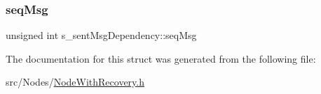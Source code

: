 \subsubsection{\texorpdfstring{seq\+Msg}{seqMsg}}
{\footnotesize\ttfamily unsigned int s\+\_\+sent\+Msg\+Dependency\+::seq\+Msg}



The documentation for this struct was generated from the following file\+:\begin{DoxyCompactItemize}
\item 
src/\+Nodes/\hyperlink{_node_with_recovery_8h}{Node\+With\+Recovery.\+h}\end{DoxyCompactItemize}
